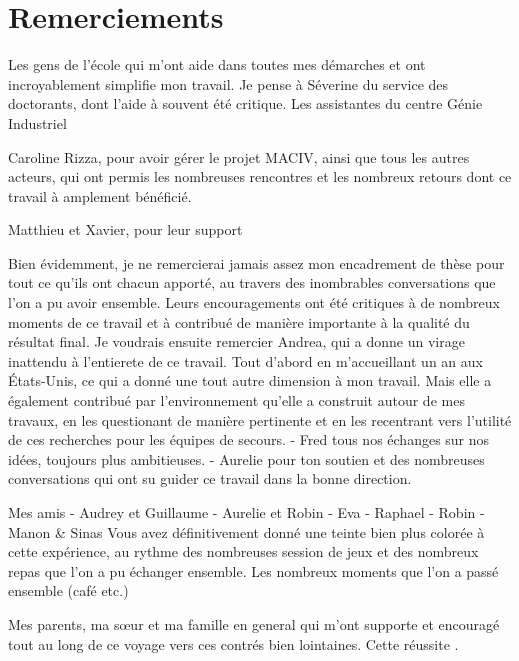 \chapter*{Remerciements}

Les gens de l'école qui m'ont aide dans toutes mes démarches et ont incroyablement simplifie
mon travail.
Je pense à Séverine du service des doctorants, dont l'aide à souvent été critique.
Les assistantes du centre Génie Industriel

Caroline Rizza, pour avoir gérer le projet MACIV, ainsi que tous les autres acteurs, qui
ont permis les nombreuses rencontres et les nombreux retours dont ce travail à amplement
bénéficié.

Matthieu et Xavier, pour leur support 

Bien évidemment, je ne remercierai jamais assez mon encadrement de thèse pour tout ce
qu'ils ont chacun apporté, au travers des inombrables conversations que l'on a pu avoir
ensemble.
Leurs encouragements ont été critiques à de nombreux moments de ce travail et à contribué
de manière importante à la qualité du résultat final.
Je voudrais ensuite remercier Andrea, qui a donne un virage inattendu à l'entierete de ce
travail. Tout d'abord en m'accueillant un an aux États-Unis, ce qui a donné une tout
autre dimension à mon travail. Mais elle a également contribué par l'environnement qu'elle
a construit autour de mes travaux, en les questionant de manière pertinente et en les
recentrant vers l'utilité de ces recherches pour les équipes de secours.
- Fred tous nos échanges sur nos idées, toujours plus ambitieuses.
- Aurelie pour ton soutien et des nombreuses conversations qui ont su guider ce travail
dans la bonne direction.


Mes amis
- Audrey et Guillaume
- Aurelie et Robin
- Eva
- Raphael
- Robin
- Manon \& Sinas
Vous avez définitivement donné une teinte bien plus colorée à cette expérience, au rythme
des nombreuses session de jeux et des nombreux repas que l'on a pu échanger ensemble.
Les nombreux moments que l'on a passé ensemble (café etc.)

Mes parents, ma sœur et ma famille en general qui m'ont supporte et encouragé tout au
long de ce voyage vers ces contrés bien lointaines.
Cette réussite .

